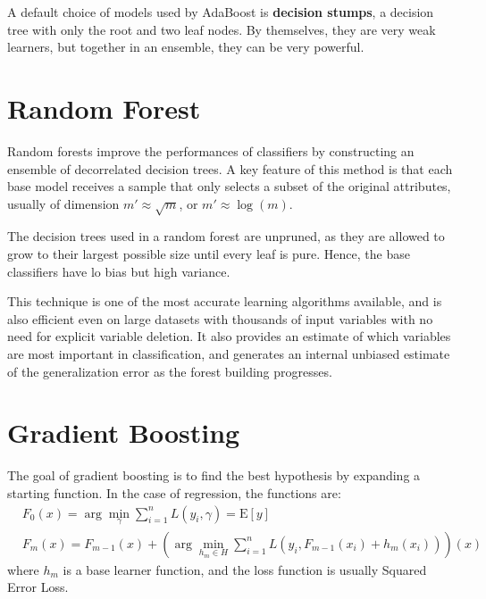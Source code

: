 A default choice of models used by AdaBoost is \textbf{decision stumps}, a decision tree with only the root and two leaf nodes. By themselves, they are very weak learners, but together in an ensemble, they can be very powerful.

\section{Random Forest}

Random forests improve the performances of classifiers by constructing an ensemble of decorrelated decision trees. A key feature of this method is that each base model receives a sample that only selects a subset of the original attributes, usually of dimension $m' \approx \sqrt{m}$, or $m' \approx \log(m)$.

The decision trees used in a random forest are unpruned, as they are allowed to grow to their largest possible size until every leaf is pure. Hence, the base classifiers have lo bias but high variance.

This technique is one of the most accurate learning algorithms available, and is also efficient even on large datasets with thousands of input variables with no need for explicit variable deletion. It also provides an estimate of which variables are most important in classification, and generates an internal unbiased estimate of the generalization error as the forest building progresses.

\section{Gradient Boosting}

The goal of gradient boosting is to find the best hypothesis by expanding a starting function. In the case of regression, the functions are:
\begin{align*}
    &F_0(x) = \arg \min_{\gamma} \sum_{i=1}^n L(y_i, \gamma) = \mathrm{E}[y] \\
    &F_m(x) = F_{m-1}(x) + \left ( \arg \min_{h_m \in H} \sum_{i=1}^n L(y_i, F_{m-1}(x_i) + h_m(x_i)) \right ) (x)
\end{align*}
where $h_m$ is a base learner function, and the loss function is usually Squared Error Loss.

